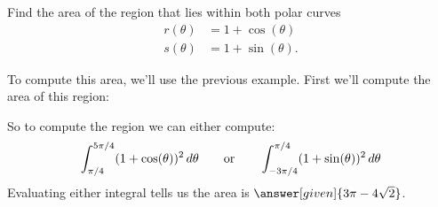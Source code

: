 \documentclass{ximera}
\begin{document}
\begin{example}
  Find the area of the region that lies within both polar curves
  \begin{align*}
    r(\theta) &= 1+ \cos(\theta)\\
    s(\theta) &= 1+ \sin(\theta).
  \end{align*}
  \begin{explanation}
    To compute this area, we'll use the previous example. First we'll compute the area of this region:
    \begin{image}
    \end{image}
    So to compute the region we can either compute:
    \[
    \int_{\pi/4}^{5\pi/4} (1+\cos(\theta))^2 \mathop{}\!d \theta \qquad\text{or}\qquad\int_{-3\pi/4}^{\pi/4} (1+\sin(\theta))^2 \mathop{}\!d \theta
    \]
    Evaluating either integral tells us the area is
    $\answer[given]{3\pi-4\sqrt{2}}$.
  \end{explanation}
\end{example}
\end{document}
